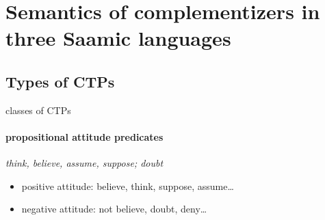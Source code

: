 \documentclass[a4,12pt]{scrartcl}
\begin{document}
\section{Semantics of complementizers in three Saamic languages}\label{semantics}%
%
\subsection{Types of CTPs}%
classes of CTPs \cite{noonan2007}
\paragraph {\bf propositional attitude predicates} {\it think, believe, assume, suppose; doubt}
\begin{itemize}
\item positive attitude: believe, think, suppose, assume\dots
\item negative attitude: not believe, doubt, deny\dots
\end{itemize}
\end{document}
